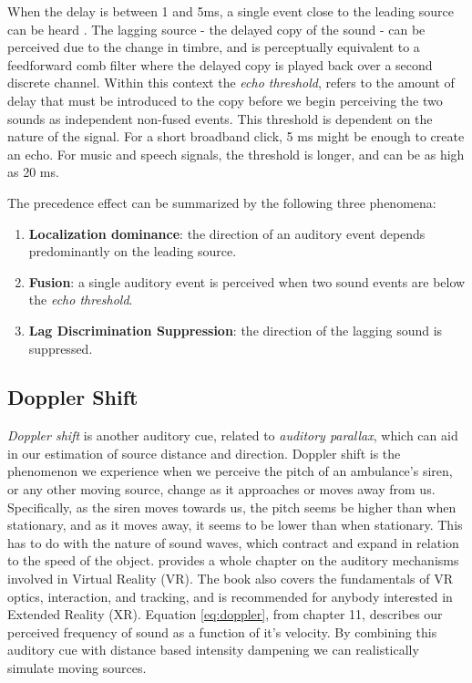 When the delay is between 1 and 5ms, a single event close to the leading source can be heard \cite{hacihabiboglu2017perceptual}. The lagging source - the delayed copy of the sound - can be perceived due to the change in timbre, and is perceptually equivalent to a feedforward comb filter where the delayed copy is played back over a second discrete channel. Within this context the \textit{echo threshold}, refers to the amount of delay that must be introduced to the copy before we begin perceiving the two sounds as independent non-fused events. This threshold is dependent on the nature of the signal. For a short broadband click, 5 ms might be enough to create an echo. For music and speech signals, the threshold is longer, and can be as high as 20 ms.

The precedence effect can be summarized by the following three phenomena: 


\begin{enumerate}
    \item \textbf{Localization dominance}: the direction of an auditory event depends predominantly on the leading source.
    \item \textbf{Fusion}: a single auditory event is perceived when two sound events are below the \textit{echo threshold}.
    \item \textbf{Lag Discrimination Suppression}: the direction of the lagging sound is suppressed.  
\end{enumerate}

\subsection{Doppler Shift}

\textit{Doppler shift} is another auditory cue, related to \textit{auditory parallax}, which can aid in our estimation of source distance and direction. Doppler shift is the phenomenon we experience when we perceive the pitch of an ambulance's siren, or any other moving source, change as it approaches or moves away from us. Specifically, as the siren moves towards us, the pitch seems be higher than when stationary, and as it moves away, it seems to be lower than when stationary. This has to do with the nature of sound waves, which contract and expand in relation to the speed of the object. \cite{lavalle2016virtual} provides a whole chapter on the auditory mechanisms involved in Virtual Reality (VR). The book also covers the fundamentals of VR optics, interaction, and tracking, and is recommended for anybody interested in Extended Reality (XR). Equation \ref{eq:doppler}, from chapter 11, describes our perceived frequency of sound as a function of it's velocity. By combining this auditory cue with distance based intensity dampening we can realistically simulate moving sources.


